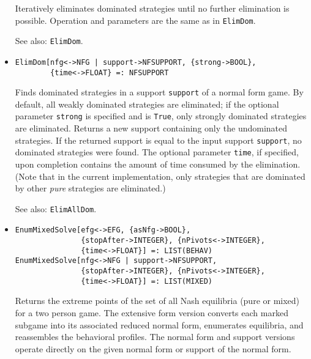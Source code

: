 \begin{itemize}
\bd Iteratively eliminates dominated strategies until no further
elimination is possible.  Operation and parameters are the same as in
{\tt ElimDom}.
\item
[See also:] {\tt ElimDom}.  
\ed

\item
\protect \large \begin{verbatim}
ElimDom[nfg<->NFG | support->NFSUPPORT, {strong->BOOL}, 
        {time<->FLOAT} =: NFSUPPORT
\end{verbatim} \normalsize

\bd
Finds dominated strategies in a support \verb+support+ of a normal
form game.  By default, all weakly dominated strategies are eliminated;
if the optional parameter \verb+strong+ is specified and is \verb+True+,
only strongly dominated strategies are eliminated.  Returns a new support
containing only the undominated strategies.  If the returned support
is equal to the input support \verb+support+, no dominated strategies were
found.  The optional parameter \verb+time+, if specified, upon completion
contains the amount of time consumed by the elimination.  (Note that in
the current implementation, only strategies that are dominated by
other {\em pure} strategies are eliminated.)  
\item
[See also:] {\tt ElimAllDom}.  
\ed

\item
\protect \large \begin{verbatim}
EnumMixedSolve[efg<->EFG, {asNfg->BOOL}, 
               {stopAfter->INTEGER}, {nPivots<->INTEGER}, 
               {time<->FLOAT}] =: LIST(BEHAV)
EnumMixedSolve[nfg<->NFG | support->NFSUPPORT, 
               {stopAfter->INTEGER}, {nPivots<->INTEGER}, 
               {time<->FLOAT}] =: LIST(MIXED)
\end{verbatim}\normalsize

\bd
Returns the extreme points of the set of all Nash equilibria (pure or
mixed) for a two person game.  The extensive form version converts
each marked subgame into its associated reduced normal form, enumerates
equilibria, and reassembles the behavioral profiles.  The normal form
and support versions operate directly on the given normal form or support
of the normal form.


\end{itemize}
